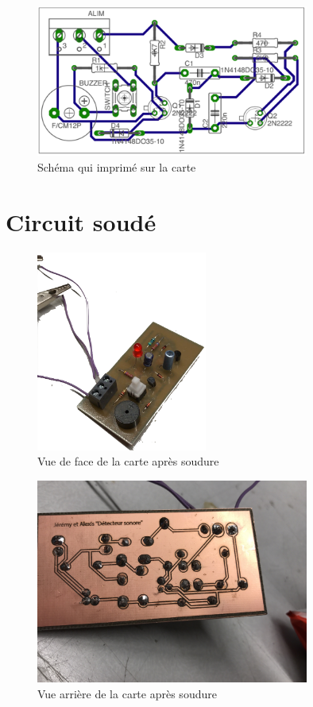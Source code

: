 \begin{figure}[H]
\centering
\includegraphics[width=0.8\textwidth]{ressources/schemaBoard}
\caption{Schéma qui imprimé sur la carte}
\label{schemaBoard}
\end{figure}

\section{Circuit soudé}

\begin{figure}[H]
\centering
\includegraphics[width=0.5\textwidth]{ressources/carteSouderC}
\caption{Vue de face de la carte après soudure}
\label{schemaBoard}
\end{figure}


\begin{figure}[H]
\centering
\includegraphics[width=0.8\textwidth]{ressources/soudure}
\caption{Vue arrière de la carte après soudure}
\label{schemaBoard}
\end{figure}

